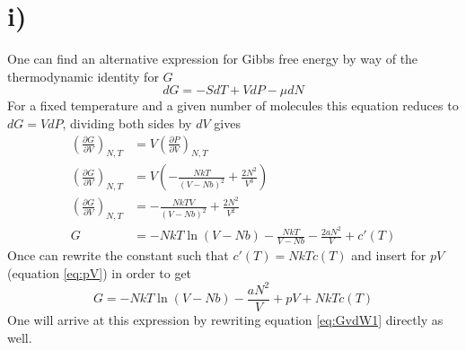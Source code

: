 \documentclass{article}
\begin{document}
\section*{i)}
One can find an alternative expression for Gibbs free energy by way of the thermodynamic identity for $G$
\begin{equation}
dG = -SdT + VdP - \mu dN
\end{equation}
For a fixed temperature and a given number of molecules this equation reduces to $dG = VdP$, dividing both sides by $dV$ gives
\begin{align*}
\left(\frac{\partial G}{\partial V}\right)_{N,T} &= V \left(\frac{\partial P}{\partial V} \right)_{N,T} \\
\left(\frac{\partial G}{\partial V}\right)_{N,T} &= V \left(-\frac{NkT}{(V-Nb)^2} + \frac{2N^2}{V^3} \right) \\
\left(\frac{\partial G}{\partial V}\right)_{N,T} &= -\frac{NkTV}{(V-Nb)^2} + \frac{2N^2}{V^2} \\
G &= -NkT \ln (V-Nb) - \frac{NkT}{V-Nb} - \frac{2aN^2}{V} + c'(T)
\end{align*}
Once can rewrite the constant such that $c'(T) = NkTc(T)$ and insert for $pV$ (equation \ref{eq:pV}) in order to get
\begin{equation}
\label{eq:GvdW2}
G = -NkT\ln (V-Nb) - \frac{aN^2}{V} + pV + NkTc(T)
\end{equation}
One will arrive at this expression by rewriting equation \ref{eq:GvdW1} directly as well.
\end{document}
